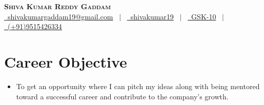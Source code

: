 \documentclass[letterpaper,11pt]{article}
\begin{document}

\begin{center}
    \textbf{\Huge \scshape Shiva Kumar Reddy Gaddam} \\ \vspace{2pt}
    \href{mailto:shivakumargaddam19@gmail.com}{\raisebox{-0.05\height}\faEnvelope \ shivakumargaddam19@gmail.com} \ $|$ \ 
    \href{https://linkedin.com/in/shivakumar19}{\raisebox{-0.05\height}\faLinkedin\ shivakumar19} \ $|$ \
    \href{https://github.com/GSK-10}{\raisebox{-0.05\height}\faGithub\ GSK-10} \ $|$ \ 
    \href{tel:+919515426334}{\raisebox{-0.05\height}\faMobile \ (+91)9515426334} \\
\end{center}

\section{Career Objective}
    \begin{itemize}[leftmargin=0.15in, label={}]
        \item{ To get an opportunity where I can pitch my ideas along with being mentored toward a successful career and
contribute to the company's growth. }
    \end{itemize}
\vspace{-12pt}
\end{document}
